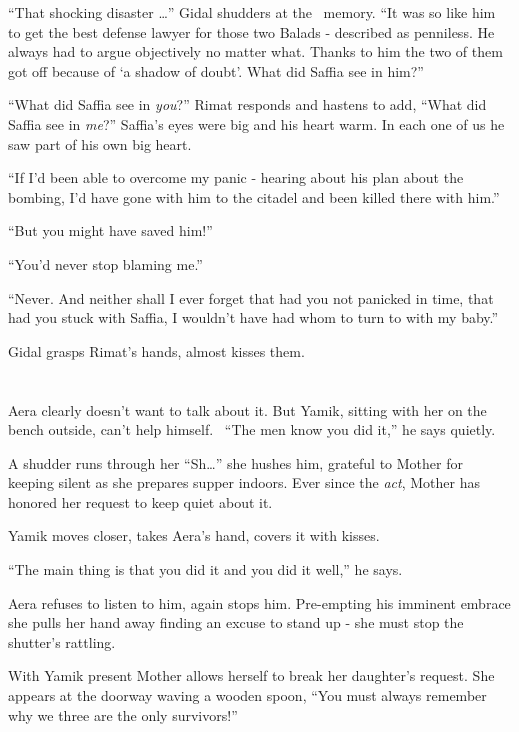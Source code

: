 \documentclass[twoside,11pt]{book}
\begin{document}
``That shocking disaster {\dots}'' Gidal shudders at the
\ memory. ``It was so like him to get the best defense lawyer for those two Balads -
described as penniless. He always had to argue objectively no matter what. Thanks to him the two of them got off
because of `a shadow of doubt'. What did Saffia see in him?''

``What did Saffia see in \textit{you}?'' Rimat responds and hastens to add,
``What did Saffia see in \textit{me}?'' Saffia's eyes were big and his heart warm. In each one of us he saw
part of his own big heart.

``If I'd been able to overcome my panic - hearing about his plan about the bombing, I'd have gone with him
to the citadel and been killed there with him.''

``But you might have saved him!''

``You'd never stop blaming me.''

``Never. And neither shall I ever forget that had you not panicked in time, that had you
stuck with Saffia, I wouldn't have had whom to turn to with my baby.''

Gidal grasps Rimat's hands, almost kisses them.


\bigskip

\chapter{}

Aera clearly doesn't want to talk about it. But Yamik, sitting with her on the bench outside, can't help himself.
\ ``The men know you did it,'' he says quietly.

A shudder runs through her ``Sh{\dots}'' she hushes him, grateful to Mother for keeping
silent as she prepares supper indoors.  Ever since the \textit{act}, Mother has honored her request to keep quiet about
it.

Yamik moves closer, takes Aera's hand, covers it with kisses.

``The main thing is that you did it and you did it well,'' he says.

Aera refuses to listen to him, again stops him. Pre-empting his imminent embrace she pulls her hand
away finding an excuse to stand up - she must stop the shutter's rattling.

With Yamik present Mother allows herself to break her daughter's request. She appears at the doorway waving a wooden
spoon, ``You must always remember why we three are the only survivors!''
\end{document}
